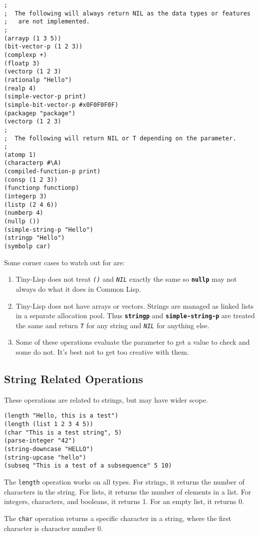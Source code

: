 \documentclass[10pt, openany]{book}
\newcommand{\operation}[1]{\textbf{\texttt{#1}}}
\newcommand{\function}[1]{\texttt{#1}}
\newcommand{\constant}[1]{\emph{\texttt{#1}}}
\newcommand{\tl}{Tiny-Lisp}
\newcommand{\cl}{Common Lisp}
\begin{document}
\begin{lstlisting}
;
;  The following will always return NIL as the data types or features
;   are not implemented.
;
(arrayp (1 3 5))
(bit-vector-p (1 2 3))
(complexp +)
(floatp 3)
(vectorp (1 2 3)
(rationalp "Hello")
(realp 4)
(simple-vector-p print)
(simple-bit-vector-p #x0F0F0F0F)
(packagep "package")
(vectorp (1 2 3)
;
;  The following will return NIL or T depending on the parameter.
;
(atomp 1)
(characterp #\A)
(compiled-function-p print)
(consp (1 2 3))
(functionp functionp)
(integerp 3)
(listp (2 4 6))
(numberp 4)
(nullp ())
(simple-string-p "Hello")
(stringp "Hello")
(symbolp car)
\end{lstlisting}

Some corner cases to watch out for are:
\begin{enumerate}
  \item \tl{} does not treat \constant{()} and \constant{NIL} exactly the same so \operation{nullp} may not always do what it does in \cl.
  \item \tl{} does not have arrays or vectors.  Strings are managed as linked lists in a separate allocation pool.  Thus \operation{stringp} and \operation{simple-string-p} are treated the same and return \constant{T} for any string and \constant{NIL} for anything else.
  \item Some of these operations evaluate the parameter to get a value to check and some do not.  It's best not to get too creative with them.
\end{enumerate}

\subsection{String Related Operations}
These operations are related to strings, but may have wider scope.
\begin{lstlisting}
(length "Hello, this is a test")
(length (list 1 2 3 4 5))
(char "This is a test string", 5)
(parse-integer "42")
(string-downcase "HELLO")
(string-upcase "hello")
(subseq "This is a test of a subsequence" 5 10)
\end{lstlisting}

The \function{length} operation works on all types.  For strings, it returns the number of characters in the string.  For lists, it returns the number of elements in a list.  For integers, characters, and booleans, it returns 1.  For an empty list, it returns 0.

The \function{char} operation returns a specific character in a string, where the first character is character number 0.
\end{document}

